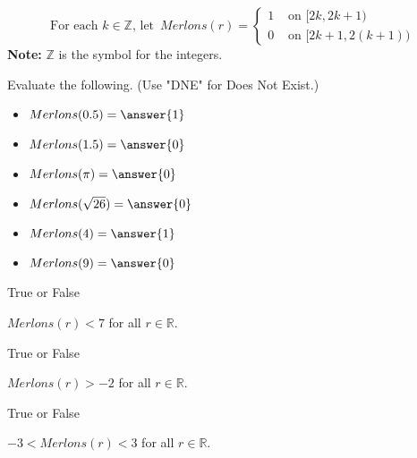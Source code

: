 \documentclass{ximera}
\author{Lee Wayand}
\begin{document}
\[
\text{For each } k \in \mathbb{Z} \text{, let } \, Merlons(r) = 
\begin{cases}
  1 & \text{ on } [2k, 2k+1) \\
  0 & \text{ on } [2k+1,2(k+1)) 
\end{cases}
\]
\textbf{Note: } $\mathbb{Z}$ is the symbol for the integers. \\







\begin{exercise}

Evaluate the following. (Use "DNE" for Does Not Exist.)


\begin{itemize}
\item $Merlons(0.5) = \answer{1}$  
\item $Merlons(1.5) = \answer{0}$  
\item $Merlons(\pi) = \answer{0}$  
\item $Merlons(\sqrt{26}) = \answer{0}$  
\item $Merlons(4) = \answer{1}$  
\item $Merlons(9) = \answer{0}$  
\end{itemize}

\end{exercise}












\begin{exercise} True or False


$Merlons(r) < 7$ for all $r \in \mathbb{R}$.

\begin{multipleChoice}
\end{multipleChoice}

\end{exercise}











\begin{exercise} True or False


$Merlons(r) > -2$ for all $r \in \mathbb{R}$.

\begin{multipleChoice}
\end{multipleChoice}

\end{exercise}











\begin{exercise} True or False


$-3 < Merlons(r) < 3$ for all $r \in \mathbb{R}$.

\begin{multipleChoice}
\end{multipleChoice}

\end{exercise}
\end{document}
